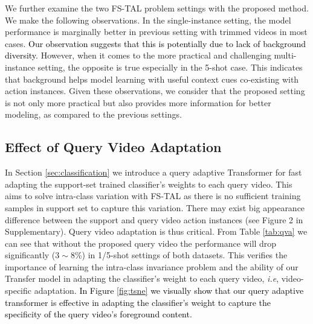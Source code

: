 \documentclass{bmvc2k}
\newcommand{\xz}[1]{\textcolor{black}{{#1}}}
\def\ie{\emph{i.e}\bmvaOneDot}
\begin{document}
We further examine the two FS-TAL problem settings 
with the proposed method. 
We make the following observations.
In the single-instance setting,
the model performance is marginally better 
in previous setting with trimmed videos in most cases.
\xz{Our observation suggests that this is potentially due to lack of background diversity.}
However, when it comes to the more practical and  challenging multi-instance setting, the opposite is true especially in the 5-shot case.
This indicates that background helps model learning
with useful context cues co-existing with action instances.
Given these observations, 
we consider that the proposed setting is not only more practical
but also provides more information for better modeling,
as compared to the previous settings.

























\vspace{-0.15in}
\subsection{Effect of Query Video Adaptation}
In Section \ref{sec:classification}
we introduce a query adaptive Transformer
for fast adapting the support-set trained classifier's weights to each query video.
This aims to solve intra-class variation with FS-TAL 
as there is no sufficient training samples in support set to capture
this variation.
There may exist big appearance difference between the support and query video action instances
(see Figure 2 in Supplementary). 
Query video adaptation is thus critical.
From Table \ref{tab:qva} we can see that without the proposed query video the performance will drop significantly ($3\sim 8$\%) in 1/5-shot settings of both datasets. 
This verifies the importance of learning the intra-class invariance problem and the ability of our Transfer model in adapting the classifier's weight to each query video, \ie, video-specific adaptation.
\textcolor{black}{In Figure \ref{fig:tsne} we visually show that our query adaptive transformer is effective in adapting the classifier's weight to capture the specificity of the query video's foreground content.}
\end{document}
